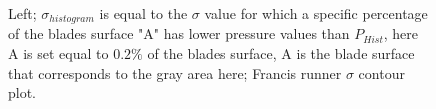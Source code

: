 \begin{figure}[h!]
\begin{minipage}[b]{0.5\linewidth}
 \centering
\end{minipage}
\begin{minipage}[b]{0.5\linewidth}
 \centering
\end{minipage}
\caption{Left; $\sigma_{histogram}$ is equal to the $\sigma$ value for which a specific percentage of the blades surface "A" has lower pressure values than $P_{Hist}$, here A is set equal to $0.2\%$ of the blades surface, A is the blade surface that corresponds to the gray area here; Francis runner $\sigma$ contour plot. }
\label{design-cav}
\end{figure}


